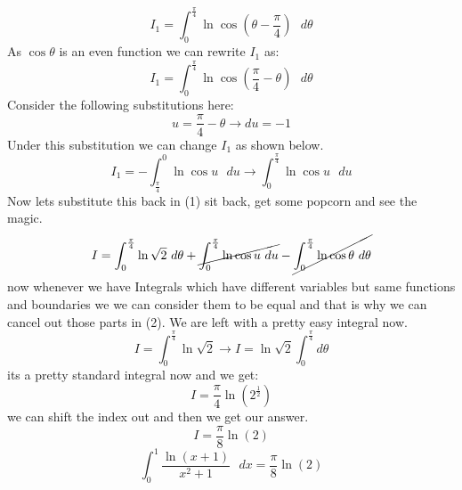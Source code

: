 \documentclass{article}
\begin{document}
\begin{equation}
    I_{1} = \int_{0}^{\frac{\pi}{4}}\ln{\cos\left(\theta-\frac{\pi}{4}\right)}\text{ $d\theta$}\nonumber
\end{equation}
As $\cos{\theta}$ is an even function we can rewrite $I_{1}$ as:
\begin{equation}
    I_{1} = \int_{0}^{\frac{\pi}{4}}\ln{\cos\left(\frac{\pi}{4}-\theta\right)}\text{ $d\theta$}\nonumber
\end{equation}
Consider the following substitutions here:
\begin{equation}
    u = \frac{\pi}{4} - \theta \to \text{$du$} = -1 \nonumber
\end{equation}
Under this substitution we can change $I_{1}$ as shown below.
\begin{equation}
    I_{1} = -\int_{\frac{\pi}{4}}^{0}\ln{\cos{u}}\text{ $du$}\nonumber \to \int_{0}^{\frac{\pi}{4}}\ln{\cos{u}}\text{ $du$}
\end{equation}
Now lets substitute this back in (1) sit back, get some popcorn and see the magic.
\begin{equation}
    I = \int_{0}^{\frac{\pi}{4}}\ln{\sqrt{2}} \text{ $d\theta$} +\cancel{\int_{0}^{\frac{\pi}{4}}\ln{\cos{u}}\text{ $du$}}  - \cancel{\int_{0}^{\frac{\pi}{4}}\ln{\cos{\theta}} \text{ $d\theta$}} \nonumber
\end{equation}
now whenever we have Integrals which have different variables but same functions and boundaries we we can consider them to be equal and that is why we can cancel out those parts in (2). We are left with a pretty easy integral now.
\begin{equation}
    I = \int_{0}^{\frac{\pi}{4}}\ln{\sqrt{2}} \to I = \ln{\sqrt{2}}  \int_{0}^{\frac{\pi}{4}}\text{$d\theta$}\nonumber
\end{equation}
its a pretty standard integral now and we get:
\begin{equation}
I = \frac{\pi}{4}\ln{(2^{\frac{1}{2}})}\nonumber
\end{equation}
we can shift the index out and then we get our answer.
\begin{equation}
I = \frac{\pi}{8}\ln{(2)}\nonumber
\end{equation}
\newpage
\Huge
\begin{equation}
    \int_{0}^{1}\frac{\ln{(x+1)}}{x^{2}+1} \text{ $dx$} = \frac{\pi}{8}\ln{(2)} \nonumber
\end{equation}
\end{document}
